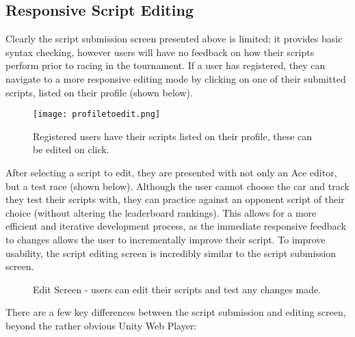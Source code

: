 \subsection{Responsive Script Editing}

Clearly the script submission screen presented above is limited; it provides basic syntax checking, however users will have no feedback on how their scripts perform prior to racing in the tournament. If a user has registered, they can navigate to a more responsive editing mode by clicking on one of their submitted scripts, listed on their profile (shown below).

\begin{figure}[H]
\centering
\texttt{[image: profiletoedit.png]}
\caption{Registered users have their scripts listed on their profile, these can be edited on click.}
\end{figure}

After selecting a script to edit, they are presented with not only an Ace editor, but a test race (shown below). Although the user cannot choose the car and track they test their scripts with, they can practice against an opponent script of their choice (without altering the leaderboard rankings). This allows for a more efficient and iterative development process, as the immediate responsive feedback to changes allows the user to incrementally improve their script. To improve usability, the script editing screen is incredibly similar to the script submission screen. 

\begin{figure}[h]
\caption{Edit Screen - users can edit their scripts and test any changes made.}
\end{figure}

There are a few key differences between the script submission and editing screen, beyond the rather obvious Unity Web Player:

